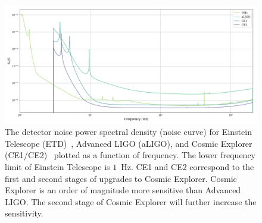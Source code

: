\begin{figure}[p]
    \centering
    \includegraphics[width=\textwidth]{Figures/Introduction/Noise_curves.png}
    \caption{The detector noise power spectral density (noise curve) for Einstein Telescope (ETD)~\cite{Punturo:2010zz}, Advanced LIGO (aLIGO), and Cosmic Explorer (CE1/CE2)~\cite{Reitze:2019iox} plotted as a function of frequency. The lower frequency limit of Einstein Telescope is $1$~Hz. CE1 and CE2 correspond to the first and second stages of upgrades to Cosmic Explorer. Cosmic Explorer is an order of magnitude more sensitive than Advanced LIGO. The second stage of Cosmic Explorer will further increase the sensitivity.}
    \label{fig:noisecurves}
\end{figure}